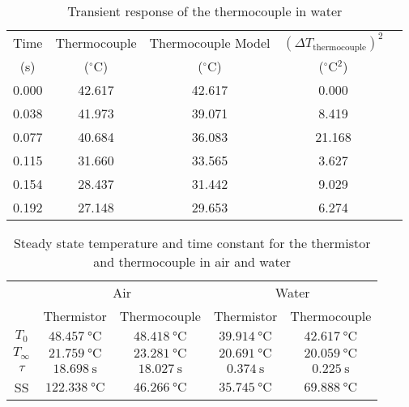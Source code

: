 \begin{table}
    \centering
    \caption{Transient response of the thermocouple in water}
    \label{tab:thermocouple_transient_water}
    \begin{tabular}{ccccc}
        \toprule
        Time & Thermocouple  & Thermocouple Model  & $(\Delta T_{\text{thermocouple}})^2$ \\
        (s) & ($^\circ$C) & ($^\circ$C) & ($^\circ$C$^2$)\\
        \midrule
        0.000 & 42.617 & 42.617 & 0.000 \\
        0.038 & 41.973 & 39.071 & 8.419 \\
        0.077 & 40.684 & 36.083 & 21.168 \\
        0.115 & 31.660 & 33.565 & 3.627 \\
        0.154 & 28.437 & 31.442 & 9.029 \\
        0.192 & 27.148 & 29.653 & 6.274 \\
        \bottomrule
    \end{tabular}
\end{table}

\begin{table}
    \centering
    \caption{Steady state temperature and time constant for the thermistor and thermocouple in air and water}
    \label{tab:steady_state_time_constant}
    \begin{tabular}{ccccc}
        \toprule
        & \multicolumn{2}{c}{Air} & \multicolumn{2}{c}{Water} \\
        \cmidrule{2-3} \cmidrule{4-5}
        & Thermistor & Thermocouple & Thermistor & Thermocouple \\  
        \midrule
        $T_0$ & $\qty{48.457}{\celsius}$ & $\qty{48.418}{\celsius}$ & $\qty{39.914}{\celsius}$ & $\qty{42.617}{\celsius}$ \\
        $T_\infty$ & $\qty{21.759}{\celsius}$ & $\qty{23.281}{\celsius}$ & $\qty{20.691}{\celsius}$ & $\qty{20.059}{\celsius}$ \\
        $\tau$ & $\qty{18.698}{\second}$ & $\qty{18.027}{\second}$ & $\qty{0.374}{\second}$ & $\qty{0.225}{\second}$ \\
        SS & $\qty{122.338}{\celsius}$ & $\qty{46.266}{\celsius}$ & $\qty{35.745}{\celsius}$ & $\qty{69.888}{\celsius}$ \\
        \bottomrule
    \end{tabular}
\end{table}

